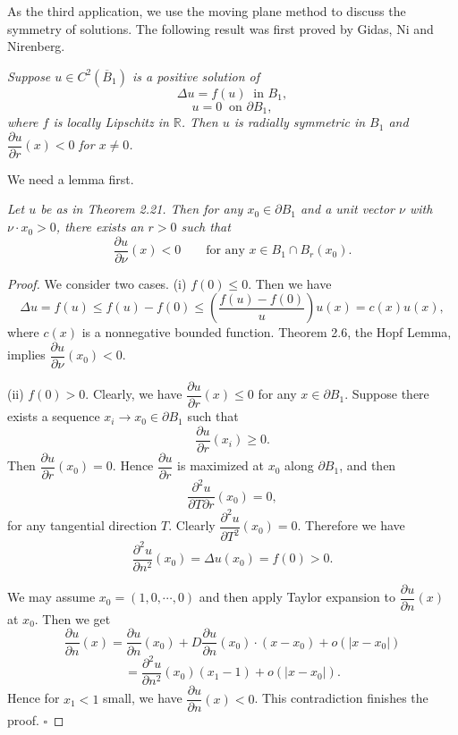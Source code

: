 As the third application, we use the moving plane method to discuss the symmetry of solutions. The following result was first proved by Gidas, Ni and Nirenberg.

\begin{theorem}\label{hanlin:maxprin-theorem-2-21}
\emph{Suppose $u\in C^2(\overline{B}_1)$ is a positive solution of}
\[
\Delta u=f(u)\ \text{ in }B_1,
\]
\[
u=0\ \text{ on }\partial B_1,
\]
\emph{where $f$ is locally Lipschitz in $\mathbb{R}$. Then $u$ is radially symmetric in $B_1$ and $\dfrac{\partial u}{\partial r}(x)<0$}
\emph{for $x\neq 0$.}
\end{theorem}

We need a lemma first.

\begin{lemma}\label{hanlin:maxprin-lemma-2-22}
\emph{Let $u$ be as in Theorem 2.21. Then for any $x_0\in\partial B_1$ and a unit vector $\nu$ with $\nu\cdot x_0>0$, there exists an $r>0$ such that}
\[
\frac{\partial u}{\partial \nu}(x)<0\qquad \text{for any }x\in B_1\cap B_r(x_0).
\]
\end{lemma}

\begin{proof}
\sketch
We consider two cases.
(i) $f(0)\le 0$. Then we have
\[
\Delta u=f(u)\le f(u)-f(0)\le \left(\frac{f(u)-f(0)}{u}\right)u(x)=c(x)u(x),
\]
where $c(x)$ is a nonnegative bounded function. Theorem 2.6, the Hopf Lemma, implies $\dfrac{\partial u}{\partial \nu}(x_0)<0$.

(ii) $f(0)>0$. Clearly, we have $\dfrac{\partial u}{\partial r}(x)\le 0$ for any $x\in\partial B_1$. Suppose there exists a sequence $x_i\to x_0\in\partial B_1$ such that
\[
\frac{\partial u}{\partial r}(x_i)\ge 0.
\]
Then $\dfrac{\partial u}{\partial r}(x_0)=0$. Hence $\dfrac{\partial u}{\partial r}$ is maximized at $x_0$ along $\partial B_1$, and then
\[
\frac{\partial^2u}{\partial T\partial r}(x_0)=0,
\]
for any tangential direction $T$. Clearly $\dfrac{\partial^2u}{\partial T^2}(x_0)=0$. Therefore we have
\[
\frac{\partial^2u}{\partial n^2}(x_0)=\Delta u(x_0)=f(0)>0.
\]

We may assume $x_0=(1,0,\cdots,0)$ and then apply Taylor expansion to $\dfrac{\partial u}{\partial n}(x)$ at $x_0$. Then we get
\[
\frac{\partial u}{\partial n}(x)=\frac{\partial u}{\partial n}(x_0)+D\frac{\partial u}{\partial n}(x_0)\cdot(x-x_0)+o(\lvert x-x_0\rvert)
\]
\[
=\frac{\partial^2u}{\partial n^2}(x_0)(x_1-1)+o(\lvert x-x_0\rvert).
\]
Hence for $x_1<1$ small, we have $\dfrac{\partial u}{\partial n}(x)<0$. This contradiction finishes the proof. \(\square\)
\end{proof}

